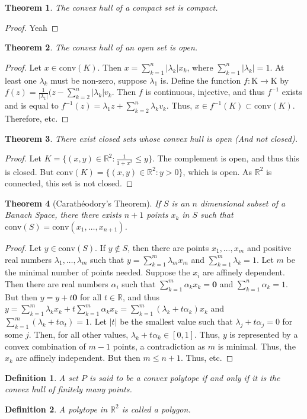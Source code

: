 \documentclass[oneside]{book}
\theoremstyle{mystyle}
\newtheorem{theorem}{Theorem}[section]
\newtheorem{definition}{Definition}[section]
\begin{document}
%
\begin{theorem}
The convex hull of a compact set is compact.
\end{theorem}
\begin{proof}
Yeah
\end{proof}
%
\begin{theorem}
The convex hull of an open set is open.
\end{theorem}
\begin{proof}
Let $x\in \textrm{conv}(K)$. Then $x=\sum_{k=1}^{n}|\lambda_k| x_k$, where $\sum_{k=1}^{n}|\lambda_k| = 1$. At least one $\lambda_k$ must be non-zero, suppose $\lambda_1$ is. Define the function $f:\textrm{K}\rightarrow \textrm{K}$ by $f(z) = \frac{1}{|\lambda_1|}(z-\sum_{k=2}^{n}|\lambda_k|v_k$. Then $f$ is continuous, injective, and thus $f^{-1}$ exists and is equal to $f^{-1}(z) = \lambda_1 z +\sum_{k=2}^{n}\lambda_k v_k$. Thus, $x\in f^{-1}(K)\subset\textrm{conv}(K)$. Therefore, etc. 
\end{proof}
%
\begin{theorem}
There exist closed sets whose convex hull is open (And not closed).
\end{theorem}
\begin{proof}
Let $K = \{(x,y)\in \mathbb{R}^2:\frac{1}{1+x^2}\leq y\}$. The complement is open, and thus this is closed. But $\textrm{conv}(K) = \{(x,y)\in \mathbb{R}^2:y>0\}$, which is open. As $\mathbb{R}^2$ is connected, this set is not closed.
\end{proof}
%
\begin{theorem}[Carath\'{e}odory's Theorem]
If $S$ is an $n$ dimensional subset of a Banach Space, there there exists $n+1$ points $x_k$ in $S$ such that $\textrm{conv}(S) = \textrm{conv}(x_1,\hdots, x_{n+1})$.
\end{theorem}
\begin{proof}
Let $y\in \textrm{conv}(S)$. If $y\notin S$, then there are points $x_1,\hdots, x_m$ and positive real numbers $\lambda_1,\hdots, \lambda_m$ such that $y=\sum_{k=1}^{m}\lambda_m x_m$ and $\sum_{k=1}^{m}\lambda_k = 1$. Let $m$ be the minimal number of points needed. Suppose the $x_i$ are affinely dependent. Then there are real numbers $\alpha_i$ such that $\sum_{k=1}^{m}\alpha_k x_k = \mathbf{0}$ and $\sum_{k=1}^{n}\alpha_k =1$. But then $y = y+t\mathbf{0}$ for all $t\in \mathbb{R}$, and thus $y = \sum_{k=1}^{m}\lambda_k x_k + t\sum_{k=1}^{m}\alpha_k x_k = \sum_{k=1}^{m}(\lambda_k + t\alpha_k)x_k$ and $\sum_{k=1}^{m}(\lambda_k+t\alpha_t) = 1$. Let $|t|$ be the smallest value such that $\lambda_j + t\alpha_j = 0$ for some $j$. Then, for all other values, $\lambda_k + t\alpha_k \in [0,1]$. Thus, $y$ is represented by a convex combination of $m-1$ points, a contradiction as $m$ is minimal. Thus, the $x_k$ are affinely independent. But then $m \leq n+1$. Thus, etc.
\end{proof}
%
\begin{definition}
A set $P$ is said to be a convex polytope if and only if it is the convex hull of finitely many points.
\end{definition}
%
\begin{definition}
A polytope in $\mathbb{R}^2$ is called a polygon.
\end{definition}
\end{document}
